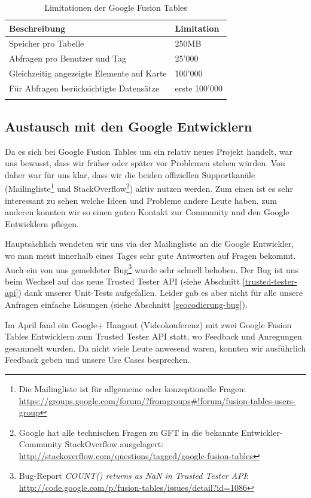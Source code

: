 \begin{longtable}{|l|l|}
\hline 
\textbf{Beschreibung} & \textbf{Limitation} \\ 
\hline 
Speicher pro Tabelle & 250MB \\ 
\hline 
Abfragen pro Benutzer und Tag & 25'000 \\ 
\hline 
Gleichzeitig angezeigte Elemente auf Karte & 100'000 \\ 
\hline 
Für Abfragen berücksichtigte Datensätze & erste 100'000 \\ 
\hline 
\caption{Limitationen der Google Fusion Tables}
\label{gft-limitations}
\end{longtable} 

\subsection{Austausch mit den Google Entwicklern}
\label{austausch-mit-google}
Da es sich bei Google Fusion Tables um ein relativ neues Projekt handelt, war uns bewusst, dass wir früher oder später vor Problemen stehen würden. Von daher war für uns klar, dass wir die beiden offiziellen Supportkanäle (Mailingliste\footnote{Die Mailingliste ist für allgemeine oder konzeptionelle Fragen: \url{https://groups.google.com/forum/?fromgroups\#!forum/fusion-tables-users-group}} und StackOverflow\footnote{Google hat alle technischen Fragen zu GFT in die bekannte Entwickler-Community StackOverflow ausgelagert: \url{http://stackoverflow.com/questions/tagged/google-fusion-tables}}) aktiv nutzen werden. Zum einen ist es sehr interessant zu sehen welche Ideen und Probleme andere Leute haben, zum anderen konnten wir so einen guten Kontakt zur Community und den Google Entwicklern pflegen.

Hauptsächlich wendeten wir uns via der Mailingliste an die Google Entwickler, wo man meist innerhalb eines Tages sehr gute Antworten auf Fragen bekommt. Auch ein von uns gemeldeter Bug\footnote{Bug-Report \emph{COUNT() returns as NaN in Trusted Tester \gls{API}}: \url{http://code.google.com/p/fusion-tables/issues/detail?id=1086}} wurde sehr schnell behoben. Der Bug ist uns beim Wechsel auf das neue Trusted Tester \gls{API} (siehe Abschnitt \ref{trusted-tester-api}) dank unserer Unit-Tests aufgefallen. Leider gab es aber nicht für alle unsere Anfragen einfache Lösungen (siehe Abschnitt \ref{geocodierung-bug}).

Im April fand ein Google+ Hangout (Videokonferenz) mit zwei Google Fusion Tables Entwicklern zum Trusted Tester \gls{API} statt, wo Feedback und Anregungen gesammelt wurden. Da nicht viele Leute anwesend waren, konnten wir ausführlich Feedback geben und unsere Use Cases besprechen.









